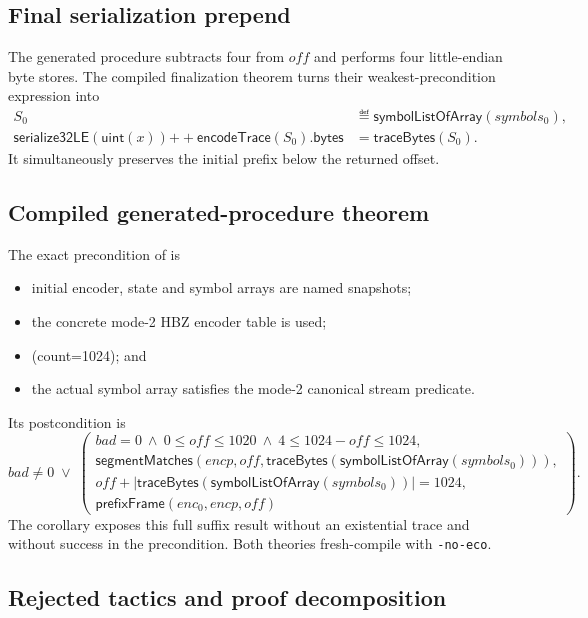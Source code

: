 \subsection*{Final serialization prepend}

The generated procedure subtracts four from $off$ and performs four
little-endian byte stores.  The compiled finalization theorem turns their
weakest-precondition expression into
\[
\begin{aligned}
  S_0&\eqdef\mathsf{symbolListOfArray}(symbols_0),\\
  \mathsf{serialize32LE}(\mathsf{uint}(x))
    \mathbin{++}\mathsf{encodeTrace}(S_0).\mathsf{bytes}
  &=\mathsf{traceBytes}(S_0).
\end{aligned}
\]
It simultaneously preserves the initial prefix below the returned offset.

\subsection*{Compiled generated-procedure theorem}

The exact precondition of
 is
\begin{itemize}
  \item initial encoder, state and symbol arrays are named snapshots;
  \item the concrete mode-2 HBZ encoder table is used;
  \item (count=1024); and
  \item the actual symbol array satisfies the mode-2 canonical stream
        predicate.
\end{itemize}
Its postcondition is
\[
 bad\ne0\;\lor\;
 \left(
 \begin{array}{l}
 bad=0\ \land\ 0\le off\le1020\ \land\ 4\le1024-off\le1024,\\
 \mathsf{segmentMatches}
   (encp,off,\mathsf{traceBytes}(\mathsf{symbolListOfArray}(symbols_0))),\\
 off+|\mathsf{traceBytes}(\mathsf{symbolListOfArray}(symbols_0))|=1024,\\
 \mathsf{prefixFrame}(enc_0,encp,off)
 \end{array}
 \right).
\]
The corollary
 exposes this full suffix result
without an existential trace and without success in the precondition.  Both
theories fresh-compile with \texttt{-no-eco}.

\subsection*{Rejected tactics and proof decomposition}

